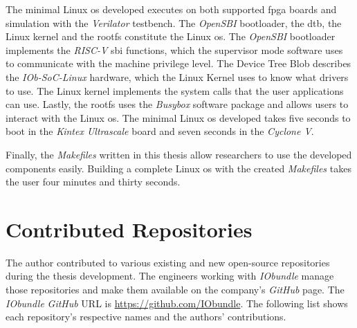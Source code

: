 The minimal Linux \acrshort{os} developed executes on both supported \acrshort{fpga} boards and simulation with the \textit{Verilator} testbench. The \textit{OpenSBI} bootloader, the \acrlong{dtb}, the Linux kernel and the \acrlong{rootfs} constitute the Linux \acrshort{os}. The \textit{OpenSBI} bootloader implements the \textit{RISC-V} \acrshort{sbi} functions, which the supervisor mode software uses to communicate with the machine privilege level. The Device Tree Blob describes the \textit{IOb-SoC-Linux} hardware, which the Linux Kernel uses to know what drivers to use. The Linux kernel implements the system calls that the user applications can use. Lastly, the \acrlong{rootfs} uses the \textit{Busybox} software package and allows users to interact with the Linux \acrshort{os}. The minimal Linux \acrshort{os} developed takes five seconds to boot in the \textit{Kintex Ultrascale} board and seven seconds in the \textit{Cyclone V}.

Finally, the \textit{Makefiles} written in this thesis allow researchers to use the developed components easily. Building a complete Linux \acrshort{os} with the created \textit{Makefiles} takes the user four minutes and thirty seconds.

\section{Contributed Repositories}
\label{section:contributions}
The author contributed to various existing and new open-source repositories during the thesis development. The engineers working with \textit{IObundle} manage those repositories and make them available on the company's \textit{GitHub} page. The \textit{IObundle} \textit{GitHub} URL is \url{https://github.com/IObundle}. The following list shows each repository's respective names and the authors' contributions.

